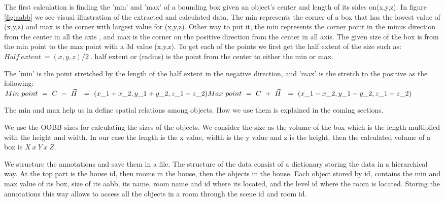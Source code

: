 The first calculation is finding the 'min' and 'max' of a bounding box given an object's center and length of its sides on(x,y,z). In figure \ref{fig:aabb} we see visual illustration of the extracted and calculated data. The min represents the corner of a box that has the lowest value of (x,y,z) and max is the corner with largest value for (x,y,z). Other way to put it, the min represents the corner point in the minus direction from the center in all the axis , and max is the corner on the positive direction from the center in all axis. 
The given size of the box is from the min point to the max point with a 3d value (x,y,z). To get each of the points we first get the half extent of the size such as: \begin{math} Half\ extent\ =(x,y,z) /2\ \end{math}. half extent or (radius) is the point from the center to either the min or max. 

The 'min' is the point stretched by the length of the half extent in the negative direction, and 'max' is the stretch to the positive as the following:   \\ 
\begin{math}
Min\ point\ =\ C\ -\ \vec{H} \ \ =\ ( x\_{1} +x\_{2} ,y\_{1} +y\_{2} ,z\_{1} +z\_{2}{}) \  \\
Max\ point\ =\ C\ +\ \vec{H} \ \ =\ ( x\_{1} -x\_{2} ,y\_{1} -y\_{2} ,z\_{1} -z\_{2}{}) \ 
\end{math}

The min and max help us in define spatial relations among objects. How we use them is explained in the coming sections.

We use the OOBB sizes for calculating the sizes of the objects. We consider the size as the volume of the box which is the length multiplied with the height and width. In our case the length is the x value, width is the y value and z is the height, then  the calculated volume of a box is \begin{math} X\ x\ Y\ x\ Z \end{math}. 


We structure the annotations and save them in a file. The structure of the data consist of a dictionary storing the data in a hierarchical way. At the top part is the house id, then rooms in the house, then the objects in the house. Each object stored by id, contains the min and max value of its box, size of its aabb, its name, room name and id where its located, and the level id where the room is located. Storing the annotations this way allows to access all the objects in a room through the scene id and room id. 

